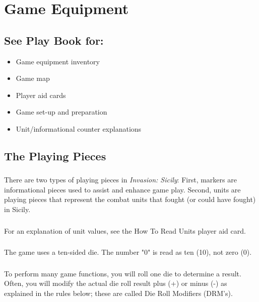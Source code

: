 \section{Game Equipment}

\subsection{See Play Book for:}
\begin{itemize}
    \item Game equipment inventory
    \item Game map
    \item Player aid cards
    \item Game set-up and preparation
    \item Unit/informational counter explanations
\end{itemize}

\subsection{The Playing Pieces}

\par
\subsubsection{}
There are two types of playing pieces in \textit{Invasion: Sicily}: First, markers are informational pieces used to assist and enhance game play. Second, units are playing pieces that represent the combat units that fought (or could have fought) in Sicily.

\subsubsection{}
For an explanation of unit values, see the How To Read Units player aid card.

\subsubsection{}
The game uses a ten-sided die. The number "0" is read as ten (10), not zero (0).

\subsubsection{}
To perform many game functions, you will roll one die to determine a result. Often, you will modify the actual die roll result plus (+) or minus (-) as explained in the rules below; these are called Die Roll Modifiers (DRM's).